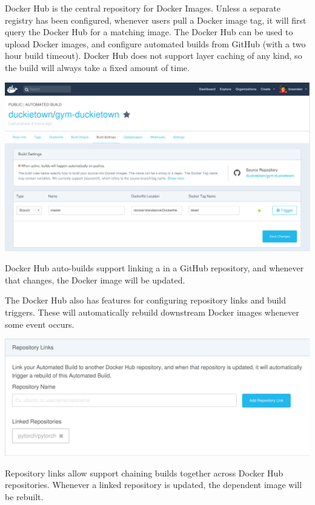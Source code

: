 Docker Hub is the central repository for Docker Images. Unless a separate registry has been configured, whenever users pull a Docker image tag, it will first query the Docker Hub for a matching image. The Docker Hub can be used to upload Docker images, and configure automated builds from GitHub (with a two hour build timeout). Docker Hub does not support layer caching of any kind, so the build will always take a fixed amount of time.\vspace{10pt}
%
\begin{centering}
\includegraphics[width=\textwidth]{../figures/docker_hub_autobuild.png}
\end{centering}
%
Docker Hub auto-builds support linking a  in a GitHub repository, and whenever that  changes, the Docker image will be updated.

The Docker Hub also has features for configuring repository links and build triggers. These will automatically rebuild downstream Docker images whenever some event occurs.\vspace{10pt}
%
\begin{centering}
\includegraphics[width=\textwidth]{../figures/docker_hub_repo_links.png}
\end{centering}
%
Repository links allow support chaining builds together across Docker Hub repositories. Whenever a linked repository is updated, the dependent image will be rebuilt.

